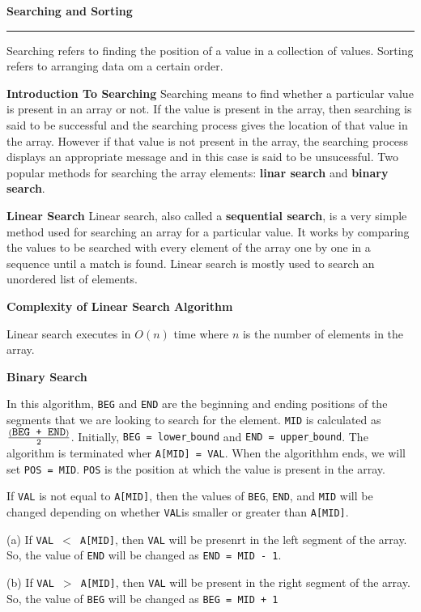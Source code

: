 {\bf Searching and Sorting}
\vskip 1mm
\hrule
\vskip 1mm
Searching refers to finding the position of a value in a collection of values. Sorting refers to arranging data om a certain order.

\vskip 3mm
{\bf Introduction To Searching}
\vskip 1mm
Searching means to find whether a particular value is present in an array or not. If the value is present in the array, then searching is said to be successful and the searching process gives the location of that value in the array. However if that value is not present in the array, the searching process displays an appropriate message and in this case is said to be unsucessful. Two popular methods for searching the array elements: {\bf linar search} and {\bf binary search}.

\filbreak
\vskip 1cm
{\bf Linear Search}
\vskip 3mm
Linear search, also called a {\bf sequential search}, is a very simple method used for searching an array for a particular value. It works by comparing the values to be searched with every element of the array one by one in a sequence until a match is found. Linear search is mostly used to search an unordered list of elements.

\vskip 3mm
{\bf Complexity of Linear Search Algorithm}

\vskip 1mm
Linear search executes in $O(n)$ time where $n$ is the number of elements in the array.

\vskip 3mm
{\bf Binary Search}

\vskip 1mm
In this algorithm, {\tt BEG} and {\tt END} are the beginning and ending positions of the segments that we are looking to search for the element. {\tt MID} is calculated as ${(\hbox{\tt BEG + END})\over 2}$. Initially, {\tt BEG = lower$\_$bound} and {\tt END = upper$\_$bound}. The algorithm is terminated wher {\tt A[MID] = VAL}. When the algorithhm ends, we will set {\tt POS = MID}. {\tt POS} is the position at which the value is present in the array.

\vskip 1mm
If {\tt VAL} is not equal to {\tt A[MID]}, then the values of {\tt BEG}, {\tt END}, and {\tt MID} will be changed depending on whether {\tt VAL}is smaller or greater than {\tt A[MID]}.

\qquad(a) If {\tt VAL $<$ A[MID]}, then {\tt VAL} will be presenrt in the left segment of the array. So, the value of {\tt END} will be changed as {\tt END = MID - 1}.

\vskip 3mm
\qquad(b) If {\tt VAL $>$ A[MID]}, then {\tt VAL} will be present in the right segment of the array. So, the value of {\tt BEG} will be changed as {\tt BEG = MID + 1}

